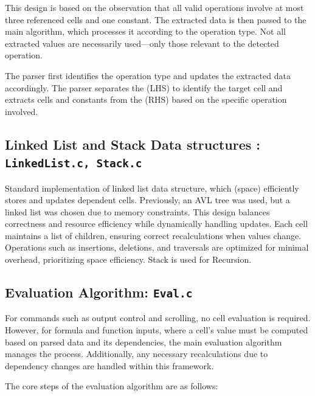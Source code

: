 \documentclass{report}
\begin{document}
This design is based on the observation that all valid operations involve at most three referenced cells and one constant. The extracted data is then passed to the main algorithm, which processes it according to the operation type. Not all extracted values are necessarily used—only those relevant to the detected operation.

The parser first identifies the operation type and updates the extracted data accordingly. The parser separates the (LHS) to identify the target cell and extracts cells and constants from the (RHS) based on the specific operation involved.


\subsection*{Linked List and Stack Data structures : \texttt{LinkedList.c, Stack.c}}
Standard implementation of linked list data structure, which (space) efficiently stores and updates dependent cells. Previously, an AVL tree was used, but a linked list was chosen due to memory constraints. This design balances correctness and resource efficiency while dynamically handling updates. Each cell maintains a list of children, ensuring correct recalculations when values change. Operations such as insertions, deletions, and traversals are optimized for minimal overhead, prioritizing space efficiency.
Stack is used for Recursion.

\subsection*{Evaluation Algorithm: \texttt{Eval.c}}
For commands such as output control and scrolling, no cell evaluation is required. However, for formula and function inputs, where a cell's value must be computed based on parsed data and its dependencies, the main evaluation algorithm manages the process. Additionally, any necessary recalculations due to dependency changes are handled within this framework.

The core steps of the evaluation algorithm are as follows:
\end{document}
